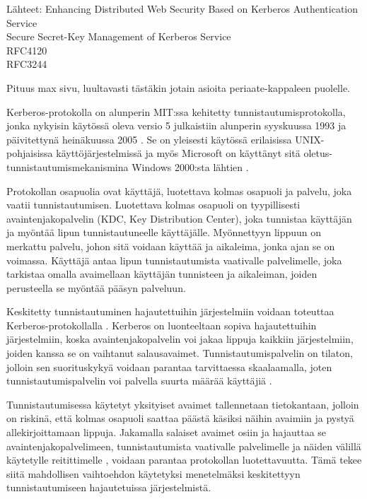 Lähteet:
Enhancing Distributed Web Security Based on Kerberos Authentication Service \cite{enchancing_distributed_web_security}\\
Secure Secret-Key Management of Kerberos Service \cite{secure_secret_key}\\
RFC4120 \cite{rfc4120}\\
RFC3244 \cite{rfc3244}

Pituus max sivu, luultavasti tästäkin jotain asioita periaate-kappaleen puolelle.

Kerberos-protokolla on alunperin MIT:ssa kehitetty tunnistautumisprotokolla, jonka nykyisin käytössä oleva versio 5 julkaistiin alunperin syyskuussa 1993 ja päivitettynä heinäkuussa 2005 \cite{rfc4120}. Se on yleisesti käytössä erilaisissa UNIX-pohjaisissa käyttöjärjestelmissä ja myös Microsoft on käyttänyt sitä oletus-tunnistautumismekanismina Windows 2000:sta lähtien \cite{rfc3244}.

Protokollan osapuolia ovat käyttäjä, luotettava kolmas osapuoli ja palvelu, joka vaatii tunnistautumisen. Luotettava kolmas osapuoli on tyypillisesti avaintenjakopalvelin (KDC, Key Distribution Center), joka tunnistaa käyttäjän ja myöntää lipun tunnistautuneelle käyttäjälle. Myönnettyyn lippuun on merkattu palvelu, johon sitä voidaan käyttää ja aikaleima, jonka ajan se on voimassa. Käyttäjä antaa lipun tunnistautumista vaativalle palvelimelle, joka tarkistaa omalla avaimellaan käyttäjän tunnisteen ja aikaleiman, joiden perusteella se myöntää pääsyn palveluun.

Keskitetty tunnistautuminen hajautettuihin järjestelmiin voidaan toteuttaa Kerberos-protokollalla \cite{enchancing_distributed_web_security}. Kerberos on luonteeltaan sopiva hajautettuihin järjestelmiin, koska avaintenjakopalvelin voi jakaa lippuja kaikkiin järjestelmiin, joiden kanssa se on vaihtanut salausavaimet. Tunnistautumispalvelin on tilaton, jolloin sen suorituskykyä voidaan parantaa tarvittaessa skaalaamalla, joten tunnistautumispalvelin voi palvella suurta määrää käyttäjiä \cite{enchancing_distributed_web_security}.

Tunnistautumisessa käytetyt yksityiset avaimet tallennetaan tietokantaan, jolloin on riskinä, että kolmas osapuoli saattaa päästä käsiksi näihin avaimiin ja pystyä allekirjoittamaan lippuja. Jakamalla salaiset avaimet osiin ja hajauttaa se avaintenjakopalvelimeen, tunnistautumista vaativalle palvelimelle ja näiden välillä käytetylle reitittimelle \cite{secure_secret_key}, voidaan parantaa protokollan luotettavuutta. Tämä tekee siitä mahdollisen vaihtoehdon käytetyksi menetelmäksi keskitettyyn tunnistautumiseen hajautetuissa järjestelmistä.
